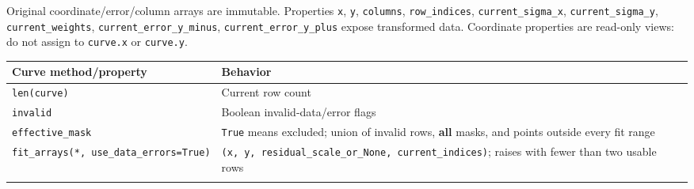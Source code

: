 \documentclass[
  10pt,
  a4paper,
  oneside]{scrreprt}
\begin{document}
Original coordinate/error/column arrays are immutable. Properties
\texttt{x}, \texttt{y}, \texttt{columns}, \texttt{row\_indices},
\texttt{current\_sigma\_x}, \texttt{current\_sigma\_y},
\texttt{current\_weights}, \texttt{current\_error\_y\_minus},
\texttt{current\_error\_y\_plus} expose transformed data. Coordinate
properties are read-only views: do not assign to \texttt{curve.x} or
\texttt{curve.y}.

\begin{longtable}[]{@{}ll@{}}
\toprule
\begin{minipage}[b]{0.47\columnwidth}\raggedright
Curve method/property\strut
\end{minipage} & \begin{minipage}[b]{0.47\columnwidth}\raggedright
Behavior\strut
\end{minipage}\tabularnewline
\midrule
\endhead
\begin{minipage}[t]{0.47\columnwidth}\raggedright
\texttt{len(curve)}\strut
\end{minipage} & \begin{minipage}[t]{0.47\columnwidth}\raggedright
Current row count\strut
\end{minipage}\tabularnewline
\begin{minipage}[t]{0.47\columnwidth}\raggedright
\texttt{invalid}\strut
\end{minipage} & \begin{minipage}[t]{0.47\columnwidth}\raggedright
Boolean invalid-data/error flags\strut
\end{minipage}\tabularnewline
\begin{minipage}[t]{0.47\columnwidth}\raggedright
\texttt{effective\_mask}\strut
\end{minipage} & \begin{minipage}[t]{0.47\columnwidth}\raggedright
\texttt{True} means excluded; union of invalid rows, \textbf{all} masks,
and points outside every fit range\strut
\end{minipage}\tabularnewline
\begin{minipage}[t]{0.47\columnwidth}\raggedright
\texttt{fit\_arrays(*,\ use\_data\_errors=True)}\strut
\end{minipage} & \begin{minipage}[t]{0.47\columnwidth}\raggedright
\texttt{(x,\ y,\ residual\_scale\_or\_None,\ current\_indices)}; raises
with fewer than two usable rows\strut
\end{minipage}\tabularnewline
\begin{minipage}[t]{0.47\columnwidth}\raggedright

\end{minipage}
\end{longtable}
\end{document}
